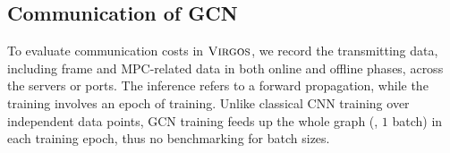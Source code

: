 \iffalse
\begin{itemize}
\item CiteSeer dataset contains $3312$ scientific publications and $6$ classes.
The citation network consists of $4732$ links.
The dictionary consists of $3703$ unique words.

\item Cora dataset contains $2708$ scientific publications and $7$ classes.
The citation network consists of $5429$ links, while the dictionary contains $1433$ unique words.

\item PubMed dataset consists of $19717$ scientific publications from the PubMed database classified into one of three classes.
The citation network consists of $44338$ links.
Each publication in the dataset is described by a TF/IDF weighted word vector from a dictionary consisting of $500$ unique words.
\end{itemize}
\fi


\subsection{Communication of GCN}
\label{sec::comm_compare_gcn}
To evaluate communication costs in $\textnormal{\textsc{Virgos}}$, we record the transmitting data, including frame and MPC-related data in both online and offline phases, across the servers or ports.
The inference refers to
a forward propagation, while the training involves an epoch of training.
Unlike classical CNN training over independent data points, GCN training feeds up the whole graph (\ie, $1$ batch) in each training epoch, thus no benchmarking for batch sizes.

